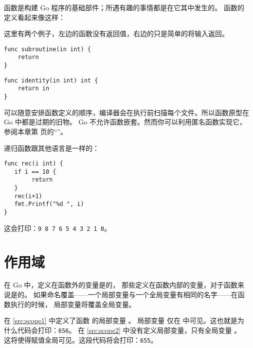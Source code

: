 
\noindent{}函数是构建 Go 程序的基础部件；所遇有趣的事情都是在它其中发生的。
函数的定义看起来像这样：

\showremarks
这里有两个例子，左边的函数没有返回值，右边的只是简单的将输入返回。

\begin{minipage}{.5\textwidth}
\begin{lstlisting}
func subroutine(in int) {
    return
}
\end{lstlisting}
\end{minipage}
\begin{minipage}{.5\textwidth}
\begin{lstlisting}
func identity(in int) int {
    return in
}
\end{lstlisting}
\end{minipage}

可以随意安排函数定义的顺序，编译器会在执行前扫描每个文件。所以函数原型在 Go 中都是过期的旧物。
Go 不允许函数嵌套。然而你可以利用匿名函数实现它，参阅本章第 \pageref{sec:functions as values}
页的“”。


递归函数跟其他语言是一样的：
\begin{lstlisting}[caption=递归函数]
func rec(i int) {
   if i == 10 {
        return
   }
   rec(i+1)
   fmt.Printf("%d ", i)
}
\end{lstlisting}
这会打印：\texttt{9 8 7 6 5 4 3 2 1 0}。

\section{作用域}
在 Go 中，定义在函数外的变量是的，
那些定义在函数内部的变量，对于函数来说是的。
如果命名覆盖——一个局部变量与一个全局变量有相同的名字——在函数执行的时候，
局部变量将覆盖全局变量。

\begin{minipage}{.5\textwidth}

\hfill
\vfill
\end{minipage}
\hfill
\begin{minipage}{.5\textwidth}

\hfill
\vfill
\end{minipage}

在 \ref{src:scope1} 中定义了函数  的局部变量 。
局部变量  仅在  中可见。这也就是为什么代码会打印：\texttt{656}。
在 \ref{src:scope2} 中没有定义局部变量，只有全局变量 。
这将使得赋值全局可见。这段代码将会打印：\texttt{655}。

